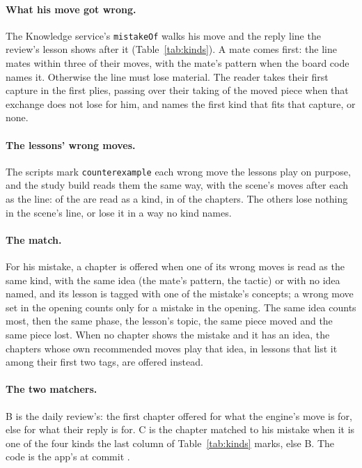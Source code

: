 \documentclass[11pt]{article}
\begin{document}
\paragraph{What his move got wrong.} The Knowledge service's \texttt{mistakeOf} walks his move
and the reply line the review's lesson shows after it (Table~\ref{tab:kinds}). A mate comes
first: the line mates within three of their moves, with the mate's pattern when the board code
names it. Otherwise the line must lose material. The reader takes their first capture in the
first \MistakePlies{} plies, passing over their taking of the moved piece when that exchange does
not lose for him, and names the first kind that fits that capture, or none.

\KindTable

\paragraph{The lessons' wrong moves.} The scripts mark \texttt{counterexample} each wrong move
the lessons play on purpose, and the study build reads them the same way, with the scene's moves
after each as the line: \ReadWrong{} of the \WrongMoves{} are read as a kind, in \WithMistakes{} of the \Chapters{}
chapters. The others lose nothing in the scene's line, or lose it in a way no kind names.

\paragraph{The match.} For his mistake, a chapter is offered when one of its wrong moves is read
as the same kind, with the same idea (the mate's pattern, the tactic) or with no idea named, and
its lesson is tagged with one of the mistake's concepts; a wrong move set in the opening counts
only for a mistake in the opening. The same idea counts most, then the same phase, the lesson's topic, the
same piece moved and the same piece lost. When no chapter shows the mistake and it has an idea,
the chapters whose own recommended moves play that idea, in lessons that list it among their
first two tags, are offered instead.

\paragraph{The two matchers.} B is the daily review's: the first chapter offered for what the
engine's move is for, else for what their reply is for. C is the chapter matched to his mistake
when it is one of the four kinds the last column of Table~\ref{tab:kinds} marks, else B. The code
is the app's at commit \texttt{\AppCommit}.
\end{document}
